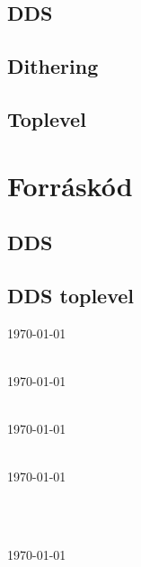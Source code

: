 \documentclass[a4paper,11pt]{article}
\begin{document}
\subsection{DDS}

\subsection{Dithering}

\subsection{Toplevel}

\section{Forráskód}

\subsection{DDS}



\subsection{DDS toplevel}




\pagebreak
\begin{thebibliography}{}


\textit{}
\url{  }
\today


\textit{}\\
\url{}
\today


\textit{}\\
\url{}
\today


\textit{}\\
\url{}
\today


\textit{}\\



\textit{}\\
\url{}
\today


\end{thebibliography}
\end{document}
